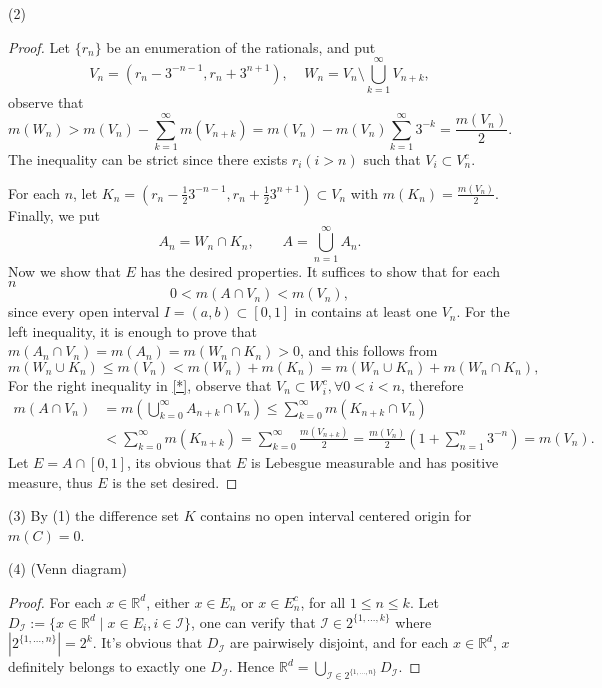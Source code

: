 \documentclass[a4paper]{article}
\begin{document}
(2)\begin{proof}
Let $\{r_n\}$ be an enumeration of the rationals, and put$$
V_n = (r_n - 3^{-n - 1}, r_n + 3^{n + 1}), \ \ \ \ \ W_n = V_n \setminus \bigcup_{k = 1}^\infty V_{n + k},
$$observe that $$
m(W_n)>m(V_n)-\sum_{k=1}^{\infty}m(V_{n+k})=m(V_n)-m(V_n)\sum_{k=1}^{\infty}3^{-k}=\frac{m(V_n)}{2}.
$$The inequality can be strict since there exists $r_i (i > n)$ such that $V_i \subset V_n^c$. 

For each $n$, let $K_n = (r_n - \frac{1}{2}3^{-n - 1}, r_n + \frac{1}{2}3^{n + 1}) \subset V_n$ with 
$m(K_n) = \frac{m(V_n)}{2}$. Finally, we put $$
A_n= W_n\cap K_n,\qquad A=\bigcup_{n=1}^{\infty}A_n.
$$Now we show that $E$ has the desired properties. It suffices to show that for each $n$ \[
0 < m(A \cap V_n) < m(V_n), \tag{*}\label{*}
\]since every open interval $I = (a, b) \subset [0, 1]$ in contains at least one $V_n$. 
For the left inequality, it is enough to prove that $m(A_n\cap V_n)=m(A_n)=m(W_n\cap K_n)>0$, and this follows
from $$
m(W_n\cup K_n)\leq m(V_n)<m(W_n)+m(K_n)=m(W_n\cup K_n)+m(W_n\cap K_n),
$$
For the right inequality in \eqref{*}, observe that $V_n \subset W_i^c, \forall 0 < i < n$, therefore \begin{align*}
m(A\cap V_n)&=m\left(\bigcup_{k=0}^{\infty}A_{n+k}\cap V_n\right)\leq\sum_{k=0}^{\infty}m(K_{n+k}\cap V_n)\\
&<\sum_{k=0}^{\infty}m(K_{n+k})=\sum_{k=0}^{\infty}\frac{m(V_{n+k})}{2}=
\frac{m(V_n)}{2}(1 + \sum_{n = 1}^n 3^{-n})=m(V_n).
\end{align*}
Let $E = A \cap [0, 1]$, its obvious that $E$ is Lebesgue measurable and has positive measure, thus $E$ is the 
set desired.

\end{proof}

(3) By (1) the difference set $K$ contains no open interval centered origin for $m(C) = 0$.

(4) (Venn diagram) \begin{proof}
For each $x \in \mathbb{R}^d$, either $x \in E_n$ or $x \in E_n^c$, for all $1 \leq n \leq k$. Let 
$D_{\mathcal{I}} := \{x \in \mathbb{R}^d \mid x \in E_i, i \in \mathcal{I}\}$, one can verify that 
$\mathcal{I} \in 2^{\{1,\dots, k\}}$ where $|2^{\{1,\dots, n\}}| = 2^k$. It's obvious that $D_\mathcal{I}$ are
pairwisely disjoint, and for each $x \in \mathbb{R}^d$, $x$ definitely belongs to exactly one $D_\mathcal{I}$. 
Hence $\mathbb{R}^d = \bigcup_{\mathcal{I} \in 2^{\{1,\dots, n\}}} D_\mathcal{I}$.
\end{proof}
\end{document}
